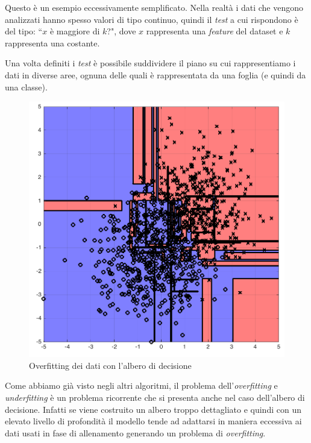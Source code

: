 \documentclass[12pt,italian]{report}
\begin{document}
Questo è un esempio eccessivamente semplificato. Nella realtà i dati che vengono analizzati hanno spesso valori di tipo continuo, quindi il \emph{test} a cui rispondono è del tipo: ``$ x $ è maggiore di $ k $?", dove $x$  rappresenta una \emph{feature} del dataset e $k$ rappresenta una costante.

Una volta definiti i \emph{test} è possibile suddividere il piano su cui rappresentiamo i dati in diverse aree, ognuna delle quali è rappresentata da una foglia (e quindi da una classe).


\begin{figure}[h!]
	\center
	\includegraphics[scale=0.2]{../img/overfit_decision_trees1} %
	\caption{Overfitting dei dati con l'albero di decisione}
	\label{fig:overfit_decision_trees1}
\end{figure}

Come abbiamo già visto negli altri algoritmi, il problema dell'\emph{overfitting} e \emph{underfitting} è un problema ricorrente che si presenta anche nel caso dell'albero di decisione.
Infatti se viene costruito un albero troppo dettagliato e quindi con un elevato livello di profondità il modello tende ad adattarsi in maniera eccessiva ai dati usati in fase di allenamento generando un problema di \emph{overfitting}. 
\end{document}

